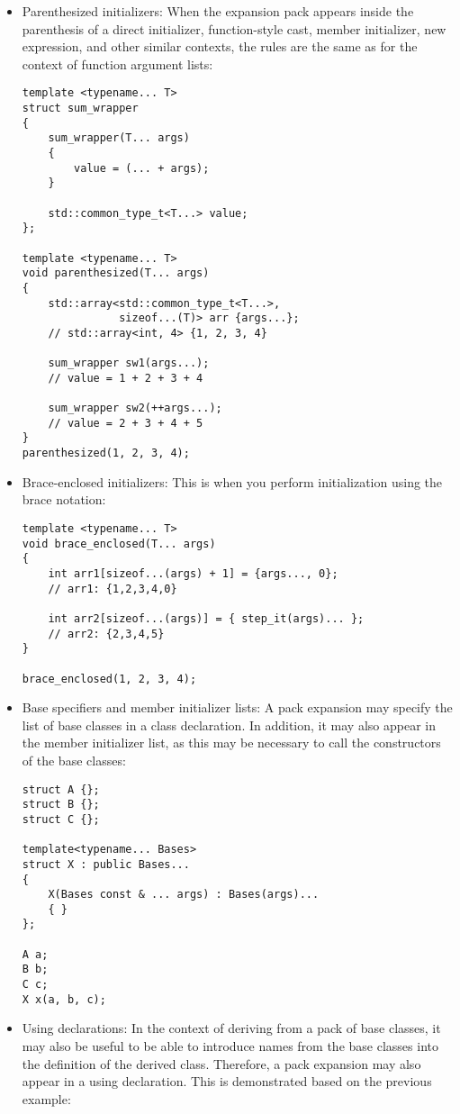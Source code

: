 \begin{itemize}
\item
Parenthesized initializers: When the expansion pack appears inside the parenthesis of a direct initializer, function-style cast, member initializer, new expression, and other similar contexts, the rules are the same as for the context of function argument lists:

\begin{lstlisting}[style=styleCXX]
template <typename... T>
struct sum_wrapper
{
	sum_wrapper(T... args)
	{
		value = (... + args);
	}

	std::common_type_t<T...> value;
};

template <typename... T>
void parenthesized(T... args)
{
	std::array<std::common_type_t<T...>,
	           sizeof...(T)> arr {args...};
	// std::array<int, 4> {1, 2, 3, 4}
	
	sum_wrapper sw1(args...);
	// value = 1 + 2 + 3 + 4
	
	sum_wrapper sw2(++args...);
	// value = 2 + 3 + 4 + 5
}
parenthesized(1, 2, 3, 4);
\end{lstlisting}

\item
Brace-enclosed initializers: This is when you perform initialization using the brace notation:

\begin{lstlisting}[style=styleCXX]
template <typename... T>
void brace_enclosed(T... args)
{
	int arr1[sizeof...(args) + 1] = {args..., 0};
	// arr1: {1,2,3,4,0}
	
	int arr2[sizeof...(args)] = { step_it(args)... };
	// arr2: {2,3,4,5}
}

brace_enclosed(1, 2, 3, 4);
\end{lstlisting}

\item
Base specifiers and member initializer lists: A pack expansion may specify the list of base classes in a class declaration. In addition, it may also appear in the member initializer list, as this may be necessary to call the constructors of the base classes:

\begin{lstlisting}[style=styleCXX]
struct A {};
struct B {};
struct C {};

template<typename... Bases>
struct X : public Bases...
{
	X(Bases const & ... args) : Bases(args)...
	{ }
};

A a;
B b;
C c;
X x(a, b, c);
\end{lstlisting}

\item
Using declarations: In the context of deriving from a pack of base classes, it may also be useful to be able to introduce names from the base classes into the definition of the derived class. Therefore, a pack expansion may also appear in a using declaration. This is demonstrated based on the previous example:


\end{itemize}
